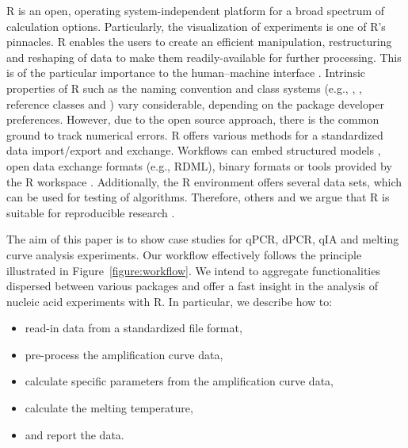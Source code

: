 R is an open, operating system-independent platform for a broad spectrum of 
calculation options. Particularly, the visualization of experiments is one of 
R's pinnacles. R enables the users to create an efficient manipulation, 
restructuring and reshaping of data to make them readily-available for further 
processing. This is of the particular importance to the human--machine interface 
\citep{Oh_2014}. Intrinsic properties of R such as the naming convention 
\citep{Baaaath_2012} and class systems (e.g., , , 
reference classes and ) vary considerable, depending on the package 
developer preferences. However, due to the open source approach, there is the 
common ground to track numerical errors. R offers various methods for a 
standardized data import/export and exchange. Workflows can embed structured 
models \citet{Guazzelli_2009}, open data exchange formats (e.g., RDML), binary 
formats \citep{michna_2013} or tools provided by the R workspace 
\citep{RDCT2010c}. Additionally, the R environment offers several data sets, 
which can be used for testing of algorithms. Therefore, others and we argue that 
R is suitable for reproducible research \citep{Murrell_2012, gandrud_2013, 
hofmann_2013, kuhn_cran_2014, Leeper_2014, liu_2014}.

The aim of this paper is to show case studies for qPCR, dPCR, qIA and melting 
curve analysis experiments. Our workflow effectively follows the principle 
illustrated in Figure~\ref{figure:workflow}. We intend to aggregate 
functionalities dispersed between various packages and offer a fast insight in 
the analysis of nucleic acid experiments with R. In particular, we describe how 
to:

\begin{itemize}
 \item read-in data from a standardized file format,
 \item pre-process the amplification curve data,
 \item calculate specific parameters from the amplification curve data,
 \item calculate the melting temperature,
 \item and report the data.
\end{itemize}

